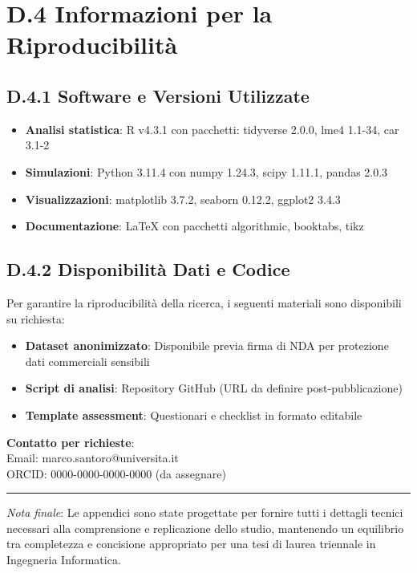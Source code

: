 \section{\texorpdfstring{\textbf{D.4 Informazioni per la Riproducibilità}}{D.4 - Informazioni per la Riproducibilità}}

\subsection{\texorpdfstring{\textbf{D.4.1 Software e Versioni Utilizzate}}{D.4.1 - Software e Versioni Utilizzate}}

\begin{itemize}
    \item \textbf{Analisi statistica}: R v4.3.1 con pacchetti: tidyverse 2.0.0, lme4 1.1-34, car 3.1-2
    \item \textbf{Simulazioni}: Python 3.11.4 con numpy 1.24.3, scipy 1.11.1, pandas 2.0.3
    \item \textbf{Visualizzazioni}: matplotlib 3.7.2, seaborn 0.12.2, ggplot2 3.4.3
    \item \textbf{Documentazione}: LaTeX con pacchetti algorithmic, booktabs, tikz
\end{itemize}

\subsection{\texorpdfstring{\textbf{D.4.2 Disponibilità Dati e Codice}}{D.4.2 - Disponibilità Dati e Codice}}

Per garantire la riproducibilità della ricerca, i seguenti materiali sono disponibili su richiesta:

\begin{itemize}
    \item \textbf{Dataset anonimizzato}: Disponibile previa firma di NDA per protezione dati commerciali sensibili
    \item \textbf{Script di analisi}: Repository GitHub (URL da definire post-pubblicazione)
    \item \textbf{Template assessment}: Questionari e checklist in formato editabile
\end{itemize}

\textbf{Contatto per richieste}: \\
Email: marco.santoro@universita.it \\
ORCID: 0000-0000-0000-0000 (da assegnare)

\vspace{1cm}

\noindent\rule{\textwidth}{0.4pt}

\textit{Nota finale}: Le appendici sono state progettate per fornire tutti i dettagli tecnici necessari alla comprensione e replicazione dello studio, mantenendo un equilibrio tra completezza e concisione appropriato per una tesi di laurea triennale in Ingegneria Informatica.